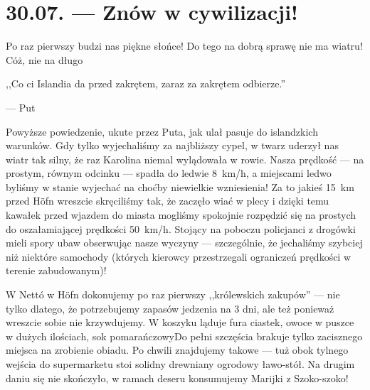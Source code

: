 \chapter*{30.07. --- Znów w cywilizacji!}

Po raz pierwszy budzi nas piękne słońce! Do tego na dobrą sprawę nie ma wiatru! Cóż, nie na długo\textellipsis

\epigraph{,,Co ci Islandia da przed zakrętem, zaraz za zakrętem odbierze.''}{--- \textup{Put}}

Powyższe powiedzenie, ukute przez Puta, jak ulał pasuje do islandzkich warunków. Gdy tylko wyjechaliśmy za najbliższy cypel, w twarz uderzył nas wiatr tak silny, że raz Karolina niemal wylądowała w rowie. Nasza prędkość --- na prostym, równym odcinku --- spadła do ledwie 8~km/h, a miejscami ledwo byliśmy w stanie wyjechać na choćby niewielkie wzniesienia! Za to jakieś 15~km przed Höfn wreszcie skręciliśmy tak, że zaczęło wiać w plecy i dzięki temu kawałek przed wjazdem do miasta mogliśmy spokojnie rozpędzić się na prostych do oszałamiającej prędkości 50~km/h. Stojący na poboczu policjanci z drogówki mieli spory ubaw obserwując nasze wyczyny --- szczególnie, że jechaliśmy szybciej niż niektóre samochody (których kierowcy przestrzegali ograniczeń prędkości w terenie zabudowanym)!



W Nettó w Höfn dokonujemy po raz pierwszy ,,królewskich zakupów'' --- nie tylko dlatego, że potrzebujemy zapasów jedzenia na 3 dni, ale też ponieważ wreszcie sobie nie krzywdujemy. W koszyku ląduje fura ciastek, owoce w puszce w dużych ilościach, sok pomarańczowy\textellipsis Do pełni szczęścia brakuje tylko zacisznego miejsca na zrobienie obiadu. Po chwili znajdujemy takowe --- tuż obok tylnego wejścia do supermarketu stoi solidny drewniany ogrodowy ławo-stół. Na drugim daniu się nie skończyło, w ramach deseru konsumujemy Marijki z Szoko-szoko!

